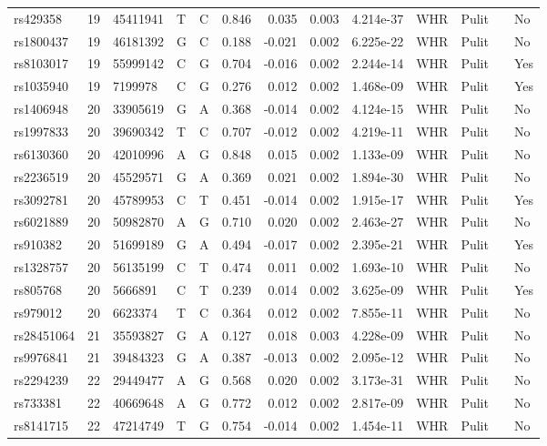 \documentclass[11pt,twoside]{bristolthesis}
\begin{document}
\begin{longtable}[t]{lrlllrrrlllll}
rs429358 & 19 & 45411941 & T & C & 0.846 & 0.035 & 0.003 & 4.214e-37 & WHR & Pulit &  & No\\
\addlinespace
rs1800437 & 19 & 46181392 & G & C & 0.188 & -0.021 & 0.002 & 6.225e-22 & WHR & Pulit &  & No\\
rs8103017 & 19 & 55999142 & C & G & 0.704 & -0.016 & 0.002 & 2.244e-14 & WHR & Pulit &  & Yes\\
rs1035940 & 19 & 7199978 & C & G & 0.276 & 0.012 & 0.002 & 1.468e-09 & WHR & Pulit &  & Yes\\
rs1406948 & 20 & 33905619 & G & A & 0.368 & -0.014 & 0.002 & 4.124e-15 & WHR & Pulit &  & No\\
rs1997833 & 20 & 39690342 & T & C & 0.707 & -0.012 & 0.002 & 4.219e-11 & WHR & Pulit &  & No\\
\addlinespace
rs6130360 & 20 & 42010996 & A & G & 0.848 & 0.015 & 0.002 & 1.133e-09 & WHR & Pulit &  & No\\
rs2236519 & 20 & 45529571 & G & A & 0.369 & 0.021 & 0.002 & 1.894e-30 & WHR & Pulit &  & No\\
rs3092781 & 20 & 45789953 & C & T & 0.451 & -0.014 & 0.002 & 1.915e-17 & WHR & Pulit &  & Yes\\
rs6021889 & 20 & 50982870 & A & G & 0.710 & 0.020 & 0.002 & 2.463e-27 & WHR & Pulit &  & No\\
rs910382 & 20 & 51699189 & G & A & 0.494 & -0.017 & 0.002 & 2.395e-21 & WHR & Pulit &  & Yes\\
\addlinespace
rs1328757 & 20 & 56135199 & C & T & 0.474 & 0.011 & 0.002 & 1.693e-10 & WHR & Pulit &  & No\\
rs805768 & 20 & 5666891 & C & T & 0.239 & 0.014 & 0.002 & 3.625e-09 & WHR & Pulit &  & Yes\\
rs979012 & 20 & 6623374 & T & C & 0.364 & 0.012 & 0.002 & 7.855e-11 & WHR & Pulit &  & No\\
rs28451064 & 21 & 35593827 & G & A & 0.127 & 0.018 & 0.003 & 4.228e-09 & WHR & Pulit &  & No\\
rs9976841 & 21 & 39484323 & G & A & 0.387 & -0.013 & 0.002 & 2.095e-12 & WHR & Pulit &  & No\\
\addlinespace
rs2294239 & 22 & 29449477 & A & G & 0.568 & 0.020 & 0.002 & 3.173e-31 & WHR & Pulit &  & No\\
rs733381 & 22 & 40669648 & A & G & 0.772 & 0.012 & 0.002 & 2.817e-09 & WHR & Pulit &  & No\\
rs8141715 & 22 & 47214749 & T & G & 0.754 & -0.014 & 0.002 & 1.454e-11 & WHR & Pulit &  & No\\

\end{longtable}
\end{document}
